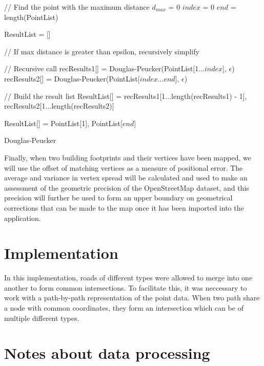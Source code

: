 \documentclass[a4paper]{article}
\begin{document}
\begin{algorithm}[H]
\SetAlgoLined
{}
    // Find the point with the maximum distance\;
    $d_{max}$ = 0\;
    $index$ = 0\;
    $end$ = length(PointList)\;
    

    ResultList = []\;
    
    // If max distance is greater than epsilon, recursively simplify\;
     {
        // Recursive call\;
        recResults1[] = Douglas-Peucker(PointList[1...$index$], $\epsilon$)\;
        recResults2[] = Douglas-Peucker(PointList[$index$...$end$], $\epsilon$)\;

        // Build the result list\;
        ResultList[] = {recResults1[1...length(recResults1) - 1], recResults2[1...length(recResults2)]}\;
    }{
        ResultList[] = {PointList[1], PointList[$end$]}\;
    }
    \;

    \caption{Douglas-Peucker}
\end{algorithm}

Finally, when two building footprints and their vertices have been mapped, we will use the offset of matching vertices as a measure of positional error. The average and variance in vertex spread will be calculated and used to make an assessment of the geometric precision of the OpenStreetMap dataset, and this precision will further be used to form an upper boundary on geometrical corrections that can be made to the map once it has been imported into the application.

\section{Implementation}

In this implementation, roads of different types were allowed to merge into one another to form common intersections. To facilitate this, it was neccessary to work with a path-by-path representation of the point data. When two path share a node with common coordinates, they form an intersection which can be of multiple different types.

\section{Notes about data processing}
\end{document}
